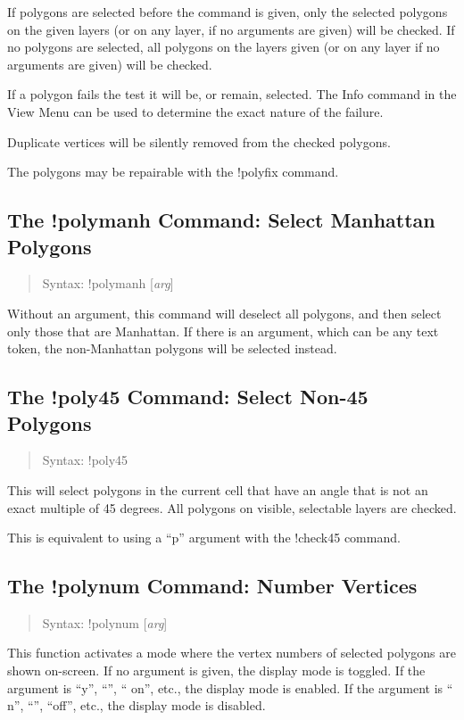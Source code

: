 If polygons are selected before the command is given, only the
selected polygons on the given layers (or on any layer, if no
arguments are given) will be checked.  If no polygons are selected,
all polygons on the layers given (or on any layer if no arguments are
given) will be checked.

If a polygon fails the test it will be, or remain, selected.  The {\cb
Info} command in the {\cb View Menu} can be used to determine the
exact nature of the failure.

Duplicate vertices will be silently removed from the checked polygons.

The polygons may be repairable with the {\cb !polyfix} command.

\subsection{The {\cb !polymanh} Command: Select Manhattan Polygons}
\begin{quote}
Syntax: {\vt !polymanh} [{\it arg\/}]
\end{quote}
Without an argument, this command will deselect all polygons, and then
select only those that are Manhattan.  If there is an argument, which
can be any text token, the non-Manhattan polygons will be selected
instead.

\subsection{The {\cb !poly45} Command: Select Non-45 Polygons}
\begin{quote}
Syntax: {\vt !poly45}
\end{quote}
This will select polygons in the current cell that have an angle that
is not an exact multiple of 45 degrees.  All polygons on visible,
selectable layers are checked.

This is equivalent to using a ``{\vt p}'' argument with the {\cb
!check45} command.

\subsection{The {\cb !polynum} Command: Number Vertices}
\begin{quote}
Syntax: {\vt !polynum} [{\it arg\/}]
\end{quote}
This function activates a mode where the vertex numbers of selected
polygons are shown on-screen.  If no argument is given, the display
mode is toggled.  If the argument is ``{\vt y}'', ``{}'', ``{\vt
on}'', etc., the display mode is enabled.  If the argument is ``{\vt
n}'', ``{}'', ``{\vt off}'', etc., the display mode is disabled.

